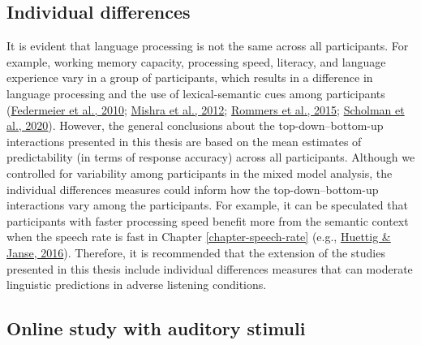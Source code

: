 \documentclass[a4paper, nobind]{templates/ociamthesis}
\begin{document}
\hypertarget{individual-differences}{%
\subsection{Individual differences}\label{individual-differences}}

It is evident that language processing is not the same across all participants.
For example, working memory capacity, processing speed, literacy, and language experience vary in a group of participants,
which results in a difference in language processing and the use of lexical-semantic cues among participants (\protect\hyperlink{ref-Federmeier2010}{Federmeier et al., 2010}; \protect\hyperlink{ref-Mishra2012}{Mishra et al., 2012}; \protect\hyperlink{ref-Rommers2015}{Rommers et al., 2015}; \protect\hyperlink{ref-Scholman2020}{Scholman et al., 2020}).
However, the general conclusions about the top-down--bottom-up interactions presented in this thesis are based on the mean estimates of predictability (in terms of response accuracy) across all participants.
Although we controlled for variability among participants in the mixed model analysis,
the individual differences measures could inform how the top-down--bottom-up interactions vary among the participants.
For example, it can be speculated that participants with faster processing speed benefit more from the semantic context when the speech rate is fast in Chapter \ref{chapter-speech-rate} (e.g., \protect\hyperlink{ref-Huettig2016a}{Huettig \& Janse, 2016}).
Therefore, it is recommended that the extension of the studies presented in this thesis include individual differences measures that can moderate linguistic predictions in adverse listening conditions.

\hypertarget{online-study-with-auditory-stimuli}{%
\subsection{Online study with auditory stimuli}\label{online-study-with-auditory-stimuli}}
\end{document}
